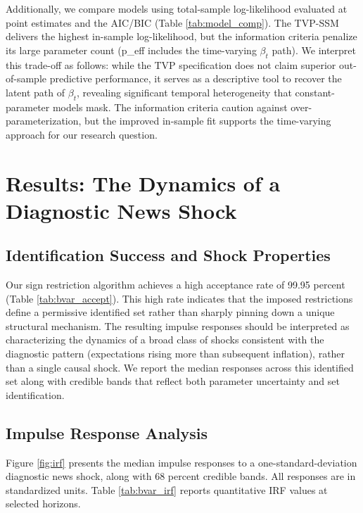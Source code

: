 \documentclass[12pt]{article}
\begin{document}


Additionally, we compare models using total-sample log-likelihood evaluated at point estimates and the AIC/BIC (Table \ref{tab:model_comp}). The TVP-SSM delivers the highest in-sample log-likelihood, but the information criteria penalize its large parameter count (p\_eff includes the time-varying $\beta_t$ path). We interpret this trade-off as follows: while the TVP specification does not claim superior out-of-sample predictive performance, it serves as a descriptive tool to recover the latent path of $\beta_t$, revealing significant temporal heterogeneity that constant-parameter models mask. The information criteria caution against over-parameterization, but the improved in-sample fit supports the time-varying approach for our research question.



\section{Results: The Dynamics of a Diagnostic News Shock}\label{sec:results_bvar}
\subsection{Identification Success and Shock Properties}
Our sign restriction algorithm achieves a high acceptance rate of 99.95 percent (Table \ref{tab:bvar_accept}). This high rate indicates that the imposed restrictions define a permissive identified set rather than sharply pinning down a unique structural mechanism. The resulting impulse responses should be interpreted as characterizing the dynamics of a broad class of shocks consistent with the diagnostic pattern (expectations rising more than subsequent inflation), rather than a single causal shock. We report the median responses across this identified set along with credible bands that reflect both parameter uncertainty and set identification.

\subsection{Impulse Response Analysis}
Figure \ref{fig:irf} presents the median impulse responses to a one-standard-deviation diagnostic news shock, along with 68 percent credible bands. All responses are in standardized units. Table \ref{tab:bvar_irf} reports quantitative IRF values at selected horizons.

\end{document}
